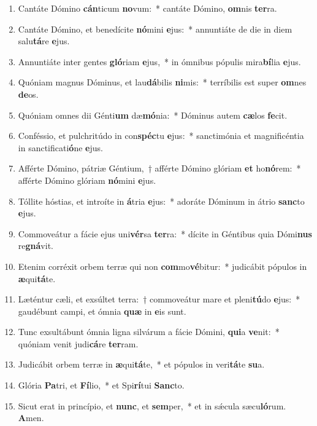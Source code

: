 \documentclass[twoside]{article}
\begin{document}
\begin{paracol}[1]{2}
\begin{enumerate}[wide, itemsep=0mm, labelwidth=!, labelindent=0pt, label=\color{gregoriocolor}\theenumi]
\item Cantáte Dómino \textbf{cán}ticum \textbf{no}vum:~* cantáte Dómino, \textbf{om}nis \textbf{ter}ra.
\item Cantáte Dómino, et benedícite \textbf{nó}mini \textbf{e}jus:~* annuntiáte de die in diem salu\textbf{tá}re \textbf{e}jus.
\item Annuntiáte inter gentes \textbf{gló}riam \textbf{e}jus,~* in ómnibus pópulis mira\textbf{bí}lia \textbf{e}jus.
\item Quóniam magnus Dóminus, et lau\textbf{dá}bilis \textbf{ni}mis:~* terríbilis est super \textbf{om}nes \textbf{de}os.
\item Quóniam omnes dii Génti\textbf{um} dæ\textbf{mó}nia:~* Dóminus autem \textbf{cæ}los \textbf{fe}cit.
\item Conféssio, et pulchritúdo in con\textbf{spéc}tu \textbf{e}jus:~* sanctimónia et magnificéntia in sanctificati\textbf{ó}ne \textbf{e}jus.
\item Afférte Dómino, pátriæ Géntium,~† afférte Dómino glóriam \textbf{et} ho\textbf{nó}rem:~* afférte Dómino glóriam \textbf{nó}mini \textbf{e}jus.
\item Tóllite hóstias, et introíte in \textbf{á}tria \textbf{e}jus:~* adoráte Dóminum in átrio \textbf{sanc}to \textbf{e}jus.
\item Commoveátur a fácie ejus uni\textbf{vér}sa \textbf{ter}ra:~* dícite in Géntibus quia Dómi\textbf{nus} re\textbf{gná}vit.
\item Etenim corréxit orbem terræ qui non \textbf{com}mo\textbf{vé}bitur:~* judicábit pópulos in \textbf{æ}qui\textbf{tá}te.
\item Læténtur cæli, et exsúltet terra:~† commoveátur mare et pleni\textbf{tú}do \textbf{e}jus:~* gaudébunt campi, et ómnia \textbf{quæ} in \textbf{e}is sunt.
\item Tunc exsultábunt ómnia ligna silvárum a fácie Dómini, \textbf{qui}a \textbf{ve}nit:~* quóniam venit judi\textbf{cá}re \textbf{ter}ram.
\item Judicábit orbem terræ in \textbf{æ}qui\textbf{tá}te,~* et pópulos in veri\textbf{tá}te \textbf{su}a.
\item Glória \textbf{Pa}tri, et \textbf{Fí}lio,~* et Spi\textbf{rí}tui \textbf{Sanc}to.
\item Sicut erat in princípio, et \textbf{nunc}, et \textbf{sem}per,~* et in sǽcula sæcu\textbf{ló}rum. \textbf{A}men.
\end{enumerate}


\end{paracol}
\end{document}
